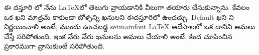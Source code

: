 ఈ దస్తూరి లో నేను \LaTeX లో తెలుగు వ్రాయడానికి వీలుగా తయారు చేసుకున్నాను. కేవలం ఒక ఖని మాత్రమే కాకుండా బోళ్ళన్ని ఖనులని ఈదస్తూరిలో ఉంచచ్చు. 
Default ఖని ని నిర్ణయించాలి అంటే, ముందు ఉంచబడ్డ  setmainfont LaTeX
ఆదేసాలలో ఒక దానిని అమలు చేస్తే సరిపోతుంది.
ఇంక వేరు వేరు ఖనులను  అమలు చేయాలి అంటే, కింద చూపించిన ప్రకారముగా వ్రాసుకుంటే సరిపోతుంది.~\\

\begin{center}
\Large{

\\


\\


\\


\\


\\


\\


\\


\\


\\


\\


\\


\\


\\


\\


\\


\\


\\


\\


\\


\\


}
\end{center}
